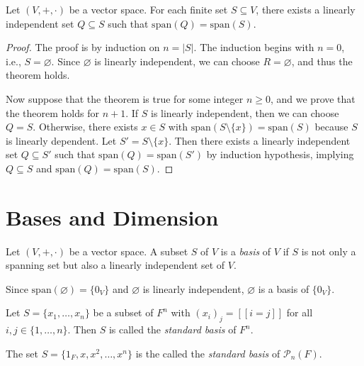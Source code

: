 \begin{theorem}\label{thm:linearly-independent-subset}
  Let $(V, +, \cdot)$ be a vector space.
  For each finite set $S \subseteq V$, there exists a linearly independent
  set $Q \subseteq S$ such that $\mathrm{span}(Q) = \mathrm{span}(S)$.
\end{theorem}
\begin{proof}
  The proof is by induction on $n = |S|$.
  The induction begins with $n = 0$, i.e., $S = \varnothing$.
  Since $\varnothing$ is linearly independent, we can choose
  $R = \varnothing$, and thus the theorem holds.

  Now suppose that the theorem is true for some integer $n \geq 0$,
  and we prove that the theorem holds for $n + 1$.
  If $S$ is linearly independent, then we can choose $Q = S$.
  Otherwise, there exists $x \in S$
  with $\mathrm{span}(S \setminus \{x\}) = \mathrm{span}(S)$ because
  $S$ is linearly dependent.
  Let $S' = S \setminus \{x\}$. Then there exists a linearly independent set
  $Q \subseteq S'$ such that $\mathrm{span}(Q) = \mathrm{span}(S')$ by
  induction hypothesis, implying
  $Q \subseteq S$ and $\mathrm{span}(Q) = \mathrm{span}(S)$.
\end{proof}

\section{Bases and Dimension}
\begin{definition}\label{def:basis}
  Let $(V, +, \cdot)$ be a vector space. A subset $S$ of $V$ is a \emph{basis}
  of $V$ if $S$ is not only a spanning set but also a linearly independent set
  of $V$.
\end{definition}

\begin{example}
  Since $\mathrm{span}(\varnothing) = \{0_V\}$ and $\varnothing$ is linearly
  independent, $\varnothing$ is a basis of $\{0_V\}$.
\end{example}
\begin{example}
  Let $S = \{x_1, \dots, x_n\}$ be a subset of $F^n$ with
  $(x_i)_j = [\![i = j]\!]$ for all $i, j \in \{1, \dots, n\}$.
  Then $S$ is called the \emph{standard basis} of $F^n$.
\end{example}
\begin{example}
  The set $S = \{1_F, x, x^2, \dots, x^n\}$ is the called the
  \emph{standard basis} of $\mathcal{P}_n(F)$.
\end{example}

